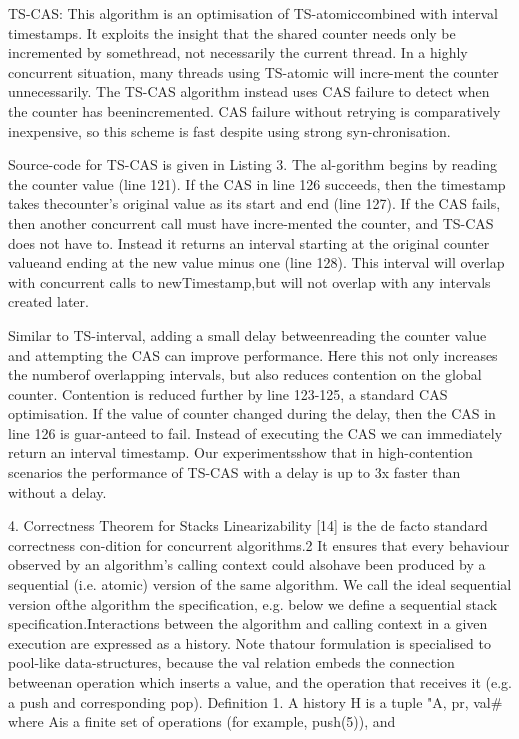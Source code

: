 TS-CAS: This algorithm is an optimisation of TS-atomiccombined with interval timestamps. It exploits the insight
that the shared counter needs only be incremented by somethread, not necessarily the current thread. In a highly concurrent situation, many threads using TS-atomic will incre-ment the counter unnecessarily. The TS-CAS algorithm instead uses CAS failure to detect when the counter has beenincremented. CAS failure without retrying is comparatively
inexpensive, so this scheme is fast despite using strong syn-chronisation.

Source-code for TS-CAS is given in Listing 3. The al-gorithm begins by reading the counter value (line 121). If
the CAS in line 126 succeeds, then the timestamp takes thecounter's original value as its start and end (line 127). If
the CAS fails, then another concurrent call must have incre-mented the counter, and TS-CAS does not have to. Instead
it returns an interval starting at the original counter valueand ending at the new value minus one (line 128). This interval will overlap with concurrent calls to newTimestamp,but will not overlap with any intervals created later.

Similar to TS-interval, adding a small delay betweenreading the counter value and attempting the CAS can improve performance. Here this not only increases the numberof overlapping intervals, but also reduces contention on the
global counter. Contention is reduced further by line 123-125, a standard CAS optimisation. If the value of counter
changed during the delay, then the CAS in line 126 is guar-anteed to fail. Instead of executing the CAS we can immediately return an interval timestamp. Our experimentsshow that in high-contention scenarios the performance of
TS-CAS with a delay is up to 3x faster than without a delay.

4. Correctness Theorem for Stacks
Linearizability [14] is the de facto standard correctness con-dition for concurrent algorithms.2 It ensures that every behaviour observed by an algorithm's calling context could alsohave been produced by a sequential (i.e. atomic) version of
the same algorithm. We call the ideal sequential version ofthe algorithm the specification, e.g. below we define a sequential stack specification.Interactions between the algorithm and calling context
in a given execution are expressed as a history. Note thatour formulation is specialised to pool-like data-structures,
because the val relation embeds the connection betweenan operation which inserts a value, and the operation that
receives it (e.g. a push and corresponding pop).
Definition 1. A history H is a tuple "A, pr, val# where Ais a finite set of operations (for example, push(5)), and

